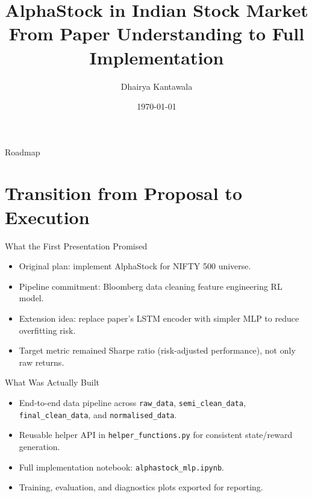 \documentclass[aspectratio=169]{beamer}
\title[AlphaStock in Indian Markets]{AlphaStock in Indian Stock Market\\From Paper Understanding to Full Implementation}
\author{Dhairya Kantawala}
\institute{IIT Bombay}
\date{\today}
\begin{document}
\begin{frame}
  \titlepage
\end{frame}

\begin{frame}{Roadmap}
  \tableofcontents
\end{frame}

\section{Transition from Proposal to Execution}
\begin{frame}{What the First Presentation Promised}
  \begin{itemize}
    \item Original plan: implement AlphaStock for NIFTY 500 universe.
    \item Pipeline commitment: Bloomberg data \textrightarrow{} cleaning \textrightarrow{} feature engineering \textrightarrow{} RL model.
    \item Extension idea: replace paper's LSTM encoder with simpler MLP to reduce overfitting risk.
    \item Target metric remained Sharpe ratio (risk-adjusted performance), not only raw returns.
  \end{itemize}
\end{frame}

\begin{frame}{What Was Actually Built}
  \begin{itemize}
    \item End-to-end data pipeline across \texttt{raw\_data}, \texttt{semi\_clean\_data}, \texttt{final\_clean\_data}, and \texttt{normalised\_data}.
    \item Reusable helper API in \texttt{helper\_functions.py} for consistent state/reward generation.
    \item Full implementation notebook: \texttt{alphastock\_mlp.ipynb}.
    \item Training, evaluation, and diagnostics plots exported for reporting.
  \end{itemize}
\end{frame}
\end{document}
